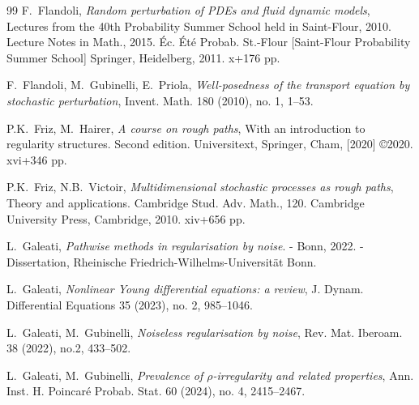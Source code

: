 \documentclass[letterpaper, 11pt,  reqno]{amsart}
\newcommand{\1}{\hspace{0.5mm}\textup{I}\hspace{0.5mm}}
\numberwithin{equation}{section}
\numberwithin{theorem}{section}
\begin{document}
\begin{thebibliography}{99}
F.~Flandoli, 
{\it Random perturbation of PDEs and fluid dynamic models},
 Lectures from the 40th Probability Summer School held in Saint-Flour, 2010. Lecture Notes in Math., 2015. 
 \'Ec. \'Et\'e Probab. St.-Flour [Saint-Flour Probability Summer School] Springer, Heidelberg, 2011. x+176 pp.




F.~Flandoli, M.~Gubinelli, E.~Priola,
{\it Well-posedness of the transport equation by stochastic perturbation},
Invent. Math. 180 (2010), no. 1, 1--53.







P.K.~Friz,  M.~Hairer, 
{\it A course on rough paths}, 
With an introduction to regularity structures. Second edition.
Universitext, Springer, Cham, [2020] \copyright 2020. xvi+346 pp.








P.K.~Friz, N.B.~Victoir,
{\it Multidimensional stochastic processes as rough paths},
Theory and applications.
Cambridge Stud. Adv. Math., 120.
Cambridge University Press, Cambridge, 2010. xiv+656 pp.


L.~Galeati, 
{\it Pathwise methods in regularisation by noise}. - Bonn, 2022. - Dissertation, 
Rheinische Friedrich-Wilhelms-Universit\"at Bonn. 

L.~Galeati, 
{\it Nonlinear {Y}oung differential equations: a review}, 
J. Dynam. Differential Equations 35 (2023), no. 2, 985--1046.



L.~Galeati, M.~Gubinelli,
{\it Noiseless regularisation by noise}, 
Rev. Mat. Iberoam. 38 (2022), no.2, 433--502.




L.~Galeati, M.~Gubinelli,
{\it  Prevalence of $\rho$-irregularity and related properties},
 Ann. Inst. H. Poincar\'e Probab. Stat.
 60 (2024), no. 4, 2415--2467.



%
%
%





\end{thebibliography}
\end{document}
